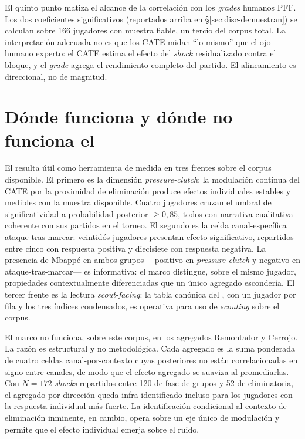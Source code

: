 El quinto punto matiza el alcance de la correlación con los
\textit{grades} humanos PFF. Los dos coeficientes significativos
(reportados arriba en §\ref{sec:disc-demuestran}) se calculan sobre
166 jugadores con muestra fiable, un tercio del corpus total. La
interpretación adecuada no es que los CATE midan ``lo mismo'' que el
ojo humano experto: el CATE estima el efecto del \textit{shock}
residualizado contra el bloque, y el \textit{grade} agrega el
rendimiento completo del partido. El alineamiento es direccional,
no de magnitud.


\section{Dónde funciona y dónde no funciona el \CCV}
\label{sec:disc-donde-funciona}

El \CCV resulta útil como herramienta de medida en tres frentes
sobre el corpus disponible. El primero es la dimensión
\textit{pressure-clutch}: la modulación continua del CATE por la
proximidad de eliminación produce efectos individuales estables y
medibles con la muestra disponible. Cuatro jugadores cruzan el
umbral de significatividad a probabilidad posterior $\geq 0{,}85$,
todos con narrativa cualitativa coherente con sus partidos en el
torneo. El segundo es la celda canal-específica
ataque-tras-marcar: veintidós jugadores presentan efecto
significativo, repartidos entre cinco con respuesta positiva y
diecisiete con respuesta negativa. La presencia de Mbappé en ambos
grupos ---positivo en \textit{pressure-clutch} y negativo en
ataque-tras-marcar--- es informativa: el marco distingue, sobre el
mismo jugador, propiedades contextualmente diferenciadas que un único
agregado escondería. El tercer frente es la lectura
\textit{scout-facing}: la tabla canónica del \CCV, con un jugador por
fila y los tres índices condensados, es operativa para uso de
\textit{scouting} sobre el corpus.

El marco no funciona, sobre este corpus, en los agregados Remontador
y Cerrojo. La razón es estructural y no metodológica. Cada agregado
es la suma ponderada de cuatro celdas canal-por-contexto cuyas
posteriores no están correlacionadas en signo entre canales, de
modo que el efecto agregado se suaviza al promediarlas. Con $N = 172$
\textit{shocks} repartidos entre 120 de fase de grupos y 52 de
eliminatoria, el agregado por dirección queda infra-identificado
incluso para los jugadores con la respuesta individual más fuerte.
La identificación condicional al contexto de eliminación
inminente, en cambio, opera sobre un eje único de modulación y
permite que el efecto individual emerja sobre el ruido.

